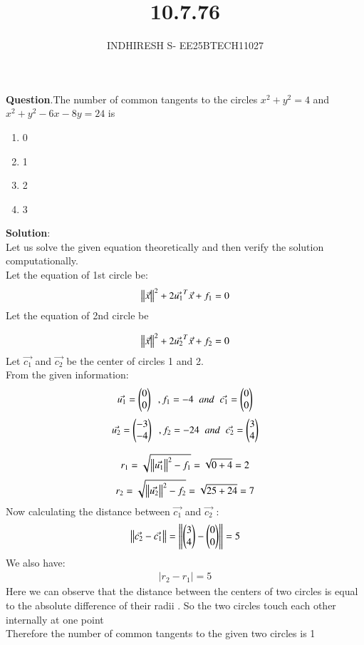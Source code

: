 \documentclass[journal]{IEEEtran}
\theoremstyle{remark}
\begin{document}

\onecolumn

\title{10.7.76}
\author{INDHIRESH S- EE25BTECH11027}
\maketitle


\renewcommand{\thefigure}{\theenumi}
\renewcommand{\thetable}{\theenumi}

\textbf{Question}.The number of common tangents to the circles $x^2 +y^2 = 4$ and $x^2 +y^2 -6x-8y = 24$ is
\begin{enumerate}
    \item 0
    \item 1
    \item 2
    \item 3
\end{enumerate}
\textbf{Solution}:\\
Let us solve the given equation theoretically and then verify the solution computationally. \\
Let the equation of 1st circle be:
\begin{align}
 \left\lVert\Vec{x}\right\rVert^2+2\Vec{u_1}^T\Vec{x}+f_1=0
\end{align}
Let the equation of 2nd circle be 

\begin{align}
  \left\lVert\Vec{x}\right\rVert^2+2\Vec{u_2}^T\Vec{x}+f_2=0
\end{align}
Let $\Vec{c_1}$ and $\Vec{c_2}$ be the center of circles 1 and 2.\\
From the given information:
\begin{align}
\Vec{u_1}=\begin{pmatrix}0\\0\end{pmatrix}\;\;,f_1=-4\;\;and\;\;\Vec{c_1}=\begin{pmatrix}0\\0\end{pmatrix}
\end{align}
\begin{align}
\Vec{u_2}=\begin{pmatrix}-3\\-4\end{pmatrix}\;\;,f_2=-24\;\;and\;\;\Vec{c_2}=\begin{pmatrix}3\\4\end{pmatrix}
\end{align}

\begin{align}
 r_1=\sqrt{\left\lVert\Vec{u_1}\right\rVert^2-f_1}=\sqrt{0+4}=2
\end{align}
\begin{align}
    r_2=\sqrt{\left\lVert\Vec{u_2}\right\rVert^2-f_2}=\sqrt{25+24}=7
\end{align}
Now calculating the distance between $\Vec{c_1}$ and $\Vec{c_2}$ :
\begin{align}
  \left\lVert\Vec{c_2}-\Vec{c_1}\right\rVert=\left\lVert\begin{pmatrix}3\\4\end{pmatrix}-\begin{pmatrix}0\\0\end{pmatrix}\right\rVert=5
\end{align}
We also have:
\begin{align}
  |r_2-r_1|=5
\end{align}
Here we can observe that  the distance between the centers of two circles is equal to the absolute difference of their radii . So the two circles touch each other internally at one point\\
Therefore the number of common tangents to the given two circles is 1
\end{document}
